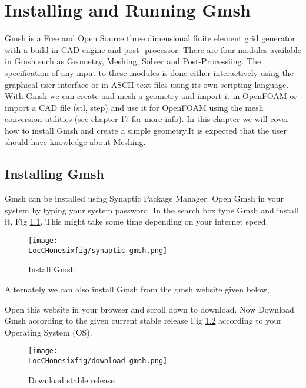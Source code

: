 \chapter{Installing and Running Gmsh}
\thispagestyle{empty}
\label{sec:chap16}
\newcommand{\LocCHonesixfig}{\Origin/CHAPTERS/chap16/figures}

Gmsh is a Free and Open Source three dimensional finite element grid generator with a build-in CAD engine and post-
processor. There are four modules available in Gmsh such as Geometry, Meshing, Solver and Post-Processiing. The specification 
of any input to these modules is done either interactively using the graphical user interface or in ASCII text files using its own scripting language.
With Gmsh we can create and mesh a geometry and import it in OpenFOAM or import a CAD file (stl, step) and use it for OpenFOAM using the mesh conversion utilities (see chapter 17 for more info).
In this chapter we will cover how to install Gmsh and create a simple geometry.It is expected that the user should have knowledge 
about Meshing.

\section{Installing Gmsh}

Gmsh can be installed using Synaptic Package Manager. Open Gmsh in your system by typing your system password.
In the search box type Gmsh and install it, Fig \ref{synaptic-gmsh}. This might take some time depending on your internet speed.

\begin{figure}[ht]  
\begin{center}  
\texttt{[image: \\LocCHonesixfig/synaptic-gmsh.png]}
\caption{Install Gmsh}
\label{synaptic-gmsh}
\end{center}  
\end{figure}


\flushleft Alternately we can also install Gmsh from the gmsh website given below,

 \newline

\flushleft Open this website in your browser and scroll down to download. Now Download Gmsh according to the given current stable release 
Fig \ref{download-gmsh} according to your Operating System (OS).

\begin{figure}[ht]  
\begin{center}  
\texttt{[image: \\LocCHonesixfig/download-gmsh.png]}
\caption{Download stable release}
\label{download-gmsh}
\end{center}  
\end{figure}

